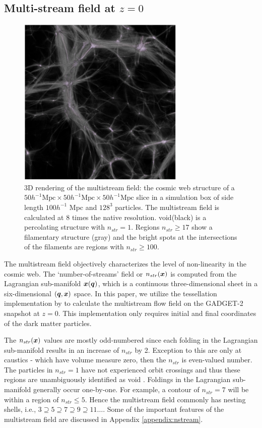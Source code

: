 \documentclass[fleqn,usenatbib,useAMS]{mnras}
\begin{document}
\subsection{Multi-stream field at $z=0$}
\label{sec:multiCalc}

\begin{figure} 
\centering\includegraphics[width=8cm]{fig1.pdf} 
\caption{3D rendering of the multistream field: the cosmic web structure of a $ 50 h^{-1} \text{Mpc} \times 50 h^{-1} \text{Mpc} \times 50 h^{-1} \text{Mpc}$ slice in a simulation box of side length $100 h^{-1}$ Mpc and $128^3$ particles. The multistream field is calculated at 8 times the native resolution. void(black) is a percolating structure with $n_{str} = 1$. Regions $n_{str} \geq 17$ show a filamentary structure (gray) and the bright spots at the intersections of the filaments are regions with $n_{str} \geq 100$. }
\label{fig:full}
\end{figure}


The multistream field objectively characterizes the level of non-linearity in the cosmic web. The `number-of-streams' field or $n_{str}(\bmath{x})$ is computed from the Lagrangian sub-manifold $\bmath{x}(\bmath{q})$, which is a continuous three-dimensional sheet in a six-dimensional  $(\bmath{q}, \bmath{x})$ space. In this paper, we utilize the tessellation implementation by \cite{Shandarin2012} to calculate the multistream flow field on the GADGET-2 snapshot at $z=0$. This implementation only requires initial and final coordinates of the dark matter particles. 

The $n_{str}(\bmath{x})$ values are mostly odd-numbered since each folding in the Lagrangian sub-manifold results in an increase of $n_{str}$ by 2. Exception to this are only at caustics - which have volume measure zero, then the $n_{str}$ is even-valued number. The particles in $n_{str} = 1$ have not experienced orbit crossings and thus these regions are unambiguously identified as void \citep{Shandarin2012}. Foldings in the Lagrangian sub-manifold generally occur one-by-one. For example, a contour of $n_{str} = 7$ will be within a region of $n_{str} \leq 5$. Hence the multistream field commonly has nesting shells, i.e., $ 3 \supseteq  5 \supseteq  7 \supseteq  9 \supseteq  11 \ldots$. Some of the important features of the multistream field are discussed in Appendix \ref{appendix:nstream}.  
\end{document}
